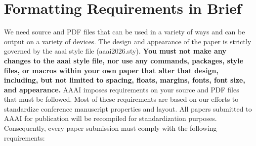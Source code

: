 \section{Formatting Requirements in Brief}
We need source and PDF files that can be used in a variety of ways and can be output on a variety of devices. The design and appearance of the paper is strictly governed by the aaai style file (aaai2026.sty).
\textbf{You must not make any changes to the aaai style file, nor use any commands, packages, style files, or macros within your own paper that alter that design, including, but not limited to spacing, floats, margins, fonts, font size, and appearance.} AAAI imposes requirements on your source and PDF files that must be followed. Most of these requirements are based on our efforts to standardize conference manuscript properties and layout. All papers submitted to AAAI for publication will be recompiled for standardization purposes. Consequently, every paper submission must comply with the following requirements:

